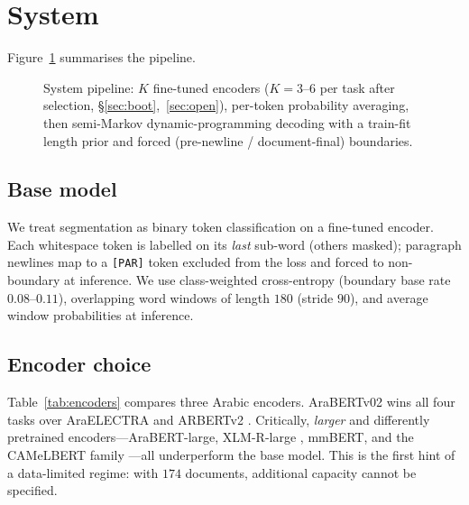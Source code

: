 \section{System}\label{sec:system}
Figure~\ref{fig:pipeline} summarises the pipeline.

\begin{figure}[t]\centering
{}
\caption{System pipeline: $K$ fine-tuned encoders ($K{=}3$--$6$ per task after
selection, \S\ref{sec:boot},~\ref{sec:open}), per-token probability averaging, then
semi-Markov dynamic-programming decoding with a train-fit length prior and forced
(pre-newline / document-final) boundaries.}
\label{fig:pipeline}
\end{figure}

\subsection{Base model}
We treat segmentation as binary token classification on a fine-tuned encoder. Each
whitespace token is labelled on its \emph{last} sub-word (others masked); paragraph
newlines map to a \texttt{[PAR]} token excluded from the loss and forced to
non-boundary at inference. We use class-weighted cross-entropy (boundary base rate
$0.08$--$0.11$), overlapping word windows of length $180$ (stride $90$), and average
window probabilities at inference.

\subsection{Encoder choice}
Table~\ref{tab:encoders} compares three Arabic encoders. AraBERTv02
\citep{antoun2020arabert} wins all four tasks over AraELECTRA
\citep{antoun2021araelectra} and ARBERTv2 \citep{abdulmageed2021arbert}. Critically,
\emph{larger} and differently pretrained encoders---AraBERT-large, XLM-R-large
\citep{conneau2020xlmr}, mmBERT, and the CAMeLBERT family
\citep{inoue2021camelbert}---all underperform the base model. This is the first hint
of a data-limited regime: with $174$ documents, additional capacity cannot be
specified.


